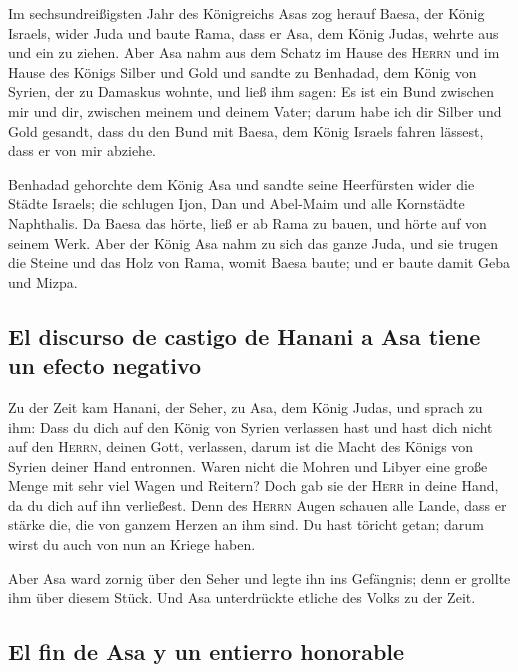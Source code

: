  Im sechsundreißigsten Jahr des Königreichs Asas zog
herauf Baesa, der König Israels, wider Juda und baute Rama, dass er Asa,
dem König Judas, wehrte aus und ein zu ziehen.  Aber Asa
nahm aus dem Schatz im Hause des \textsc{Herrn} und im Hause des Königs
Silber und Gold und sandte zu Benhadad, dem König von Syrien, der zu
Damaskus wohnte, und ließ ihm sagen:  Es ist ein Bund
zwischen mir und dir, zwischen meinem und deinem Vater; darum habe ich
dir Silber und Gold gesandt, dass du den Bund mit Baesa, dem König
Israels fahren lässest, dass er von mir abziehe.

 Benhadad gehorchte dem König Asa und sandte seine
Heerfürsten wider die Städte Israels; die schlugen Ijon, Dan und
Abel-Maim und alle Kornstädte Naphthalis.  Da Baesa das
hörte, ließ er ab Rama zu bauen, und hörte auf von seinem Werk.
 Aber der König Asa nahm zu sich das ganze Juda, und sie
trugen die Steine und das Holz von Rama, womit Baesa baute; und er baute
damit Geba und Mizpa.

\hypertarget{el-discurso-de-castigo-de-hanani-a-asa-tiene-un-efecto-negativo}{%
\subsection{El discurso de castigo de Hanani a Asa tiene un efecto
negativo}\label{el-discurso-de-castigo-de-hanani-a-asa-tiene-un-efecto-negativo}}

 Zu der Zeit kam Hanani, der Seher, zu Asa, dem König
Judas, und sprach zu ihm: Dass du dich auf den König von Syrien
verlassen hast und hast dich nicht auf den \textsc{Herrn}, deinen Gott,
verlassen, darum ist die Macht des Königs von Syrien deiner Hand
entronnen.  Waren nicht die Mohren und Libyer eine große
Menge mit sehr viel Wagen und Reitern? Doch gab sie der \textsc{Herr} in
deine Hand, da du dich auf ihn verließest.  Denn des
\textsc{Herrn} Augen schauen alle Lande, dass er stärke die, die von
ganzem Herzen an ihm sind. Du hast töricht getan; darum wirst du auch
von nun an Kriege haben.

 Aber Asa ward zornig über den Seher und legte ihn ins
Gefängnis; denn er grollte ihm über diesem Stück. Und Asa unterdrückte
etliche des Volks zu der Zeit.

\hypertarget{el-fin-de-asa-y-un-entierro-honorable}{%
\subsection{El fin de Asa y un entierro
honorable}\label{el-fin-de-asa-y-un-entierro-honorable}}

